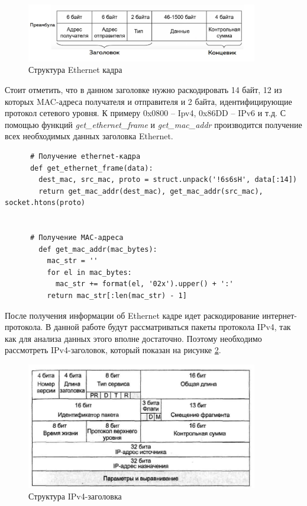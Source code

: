 \documentclass[bachelor, och, coursework]{SCWorks}
\begin{document}
    \begin{figure}[H]
      \centering
      \includegraphics[width=0.9\textwidth]{photo/eth-frame.jpg}
      \caption{Структура Ethernet кадра}
      \label{eth-frame}
    \end{figure}
    
    Стоит отметить, что в данном заголовке нужно раскодировать 14 байт, 12 из которых MAC-адреса получателя и отправителя и 2 байта, идентифицирующие протокол
    сетевого уровня. К примеру 0x0800 -- Ipv4, 0x86DD -- IPv6 и т.д. С помощью функций \textit{get\_ethernet\_frame} и \textit{get\_mac\_addr} производится получение всех необходимых
    данных заголовка Ethernet.
    
    \begin{verbatim}
      # Получение ethernet-кадра
      def get_ethernet_frame(data):
        dest_mac, src_mac, proto = struct.unpack('!6s6sH', data[:14])
        return get_mac_addr(dest_mac), get_mac_addr(src_mac), socket.htons(proto)
      
      
      # Получение MAC-адреса
        def get_mac_addr(mac_bytes):
          mac_str = ''
          for el in mac_bytes:
            mac_str += format(el, '02x').upper() + ':'
          return mac_str[:len(mac_str) - 1]
      \end{verbatim}

    После получения информации об Ethernet кадре идет раскодирование интернет-протокола. В данной работе будут рассматриваться пакеты протокола IPv4, 
    так как для анализа данных этого вполне достаточно. Поэтому необходимо рассмотреть IPv4-заголовок, который показан на рисунке \ref{ipv4-header}.

    \begin{figure}[H]
      \centering
      \includegraphics[width=0.9\textwidth]{photo/ipv4-header.jpg}
      \caption{Структура IPv4-заголовка}
      \label{ipv4-header}
    \end{figure}
      
\end{document}
